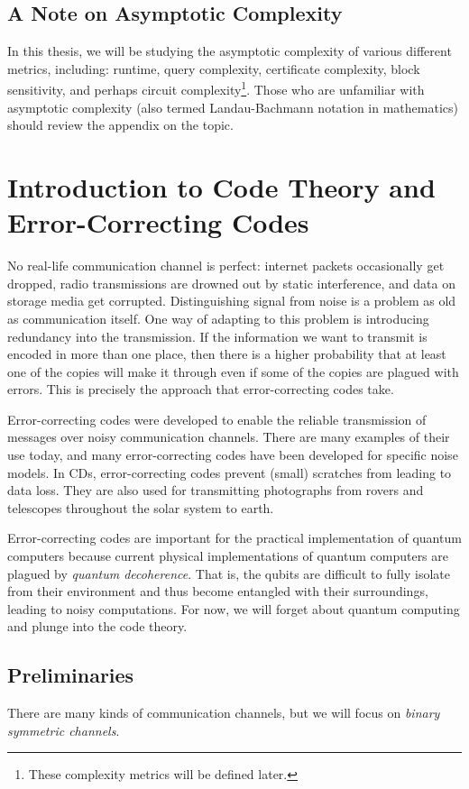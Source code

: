 \documentclass[12pt,twoside]{reedthesis}
\theoremstyle{definition}
\begin{document}
\section{A Note on Asymptotic Complexity}

In this thesis, we will be studying the asymptotic complexity of various different metrics, including: runtime, query complexity, certificate complexity, block sensitivity, and perhaps circuit complexity\footnote{These complexity metrics will be defined later.}. Those who are unfamiliar with asymptotic complexity (also termed Landau-Bachmann notation in mathematics) should review the appendix on the topic. 


\chapter{Introduction to Code Theory and Error-Correcting Codes}	

No real-life communication channel is perfect: internet packets occasionally get dropped, radio transmissions are drowned out by static interference, and data on storage media get corrupted. Distinguishing signal from noise is a problem as old as communication itself. One way of adapting to this problem is introducing redundancy into the transmission. If the information we want to transmit is encoded in more than one place, then there is a higher probability that at least one of the copies will make it through even if some of the copies are plagued with errors. This is precisely the approach that error-correcting codes take. 


Error-correcting codes were developed to enable the reliable transmission of messages over noisy communication channels. There are many examples of their use today, and many error-correcting codes have been developed for specific noise models. In CDs, error-correcting codes prevent (small) scratches from leading to data loss. They are also used for transmitting photographs from rovers and telescopes throughout the solar system to earth. 

Error-correcting codes are important for the practical implementation of quantum computers because current physical implementations of quantum computers are plagued by \textit{quantum decoherence}. That is, the qubits are difficult to fully isolate from their environment and thus become entangled with their surroundings, leading to noisy computations. For now, we will forget about quantum computing and plunge into the code theory.

\section{Preliminaries}
There are many kinds of communication channels, but we will focus on \textit{binary symmetric channels}. 
\end{document}
